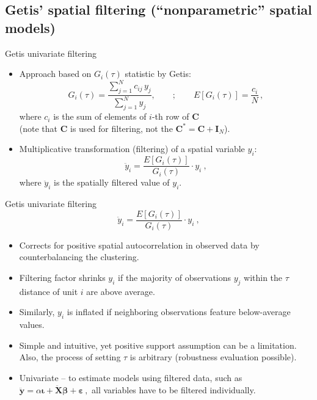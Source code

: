 \documentclass{beamer}
\begin{document}
\subsection{Getis' spatial filtering (``nonparametric'' spatial models)}
\begin{frame}{Getis univariate filtering}
\begin{itemize}
    \item Approach based on $G_i(\tau)$ statistic by Getis: 
    $$
    G_i(\tau) = \frac{\sum_{j=1}^N c_{ij} \, y_j}{\sum_{j=1}^N y_j},
    \qquad ; \qquad
    E \left[G_i(\tau) \right] = \frac{c_i}{N}\,,
    $$
    where $c_i$ is the sum of elements of $i$-th row of $\bm{C}$ \\(note that $\bm{C}$ is used for filtering, not the $\bm{C}^{\ast} = \bm{C}+\bm{I}_N$).
    \bigskip
    \item Multiplicative transformation (filtering) of a spatial variable $y_i$: 
    \begin{equation*}
    \ddot{y}_i = \frac{E \left[G_i(\tau) \right]}{G_i(\tau)} \cdot y_i \>,
    \end{equation*}
    where $\ddot{y}_i$ is the spatially filtered value of $y_i$.
\end{itemize}
\end{frame}
\begin{frame}{Getis univariate filtering}
$$\ddot{y}_i = \frac{E \left[G_i(\tau) \right]}{G_i(\tau)} \cdot y_i \>,$$
\begin{itemize}
    \item Corrects for positive spatial autocorrelation in observed data by counterbalancing the clustering.
    \smallskip
    \item Filtering factor shrinks $y_i$ if the majority of observations $y_j$ within the $\tau$ distance of unit $i$ are above average. 
    \smallskip
    \item Similarly, $y_i$ is inflated if neighboring observations feature below-average values.
    \smallskip
    \item Simple and intuitive, yet positive support assumption can be a limitation. Also, the process of setting $\tau$ is arbitrary (robustness evaluation possible). 
    \item Univariate -- to estimate models using filtered data, such as $\bm{\ddot{y}} = 
  \alpha \bm{\iota} + \bm{\ddot{X} \beta} + \bm{\varepsilon} \, ,$ all variables have to be filtered individually.
\end{itemize}
\end{frame}
\end{document}
